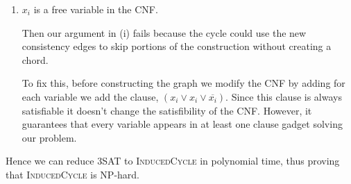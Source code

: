 \documentclass[12pt]{article}
\begin{document}
\begin{solution}
\begin{enumerate}
\begin{enumerate}
\begin{enumerate}
                \item $x_i$ is a free variable in the CNF. 
                
                Then our argument in (i) fails because the cycle could use the new consistency edges to skip portions of the construction without creating a chord.
                
                To fix this, before constructing the graph we modify the CNF by adding for each variable we add the clause, $(x_i \vee x_i \vee \overline{x_i})$. Since this clause is always satisfiable it doesn't change the satisfibility of the CNF. However, it guarantees that every variable appears in at least one clause gadget solving our problem.
            \end{enumerate}
        \end{enumerate}
    \end{enumerate}
    Hence we can reduce \textsc{3SAT} to \textsc{InducedCycle} in polynomial time, thus proving that \textsc{InducedCycle} is NP-hard. 
\end{solution}
\end{document}

